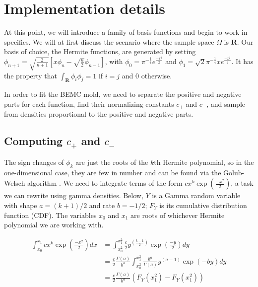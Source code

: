 \documentclass{article}
\begin{document}
\section{Implementation details}
At this point, we will introduce a family of basis functions and begin to work in specifics. We will at first discuss the scenario where the sample space $\Omega$ is $\mathbf{R}$. %
Our basis of choice, the Hermite functions, are generated by setting $\phi_{n+1}=\sqrt{\frac{2}{n+1}}\left[x\phi_n-\sqrt{\frac{n}{2}}\phi_{n-1}\right]$, with $\phi_0=\pi^{-\frac{1}{4}}e^{\frac{-x^2}{2}}$ and $\phi_1=\sqrt{2} \pi^{-\frac{1}{4}}xe^{\frac{-x^2}{2}}$. It has the property that $\int_{\mathbf{R}}\phi_i\phi_j=1$ if $i = j$ and $0$ otherwise. 

In order to fit the BEMC mold, we need to separate the positive and negative parts for each function, find their normalizing constants $c_+$ and $c_-$, and sample from densities proportional to the positive and negative parts. 

\subsection{Computing $c_+$ and $c_-$}
The sign changes of $\phi_k$ are just the roots of the $k$th Hermite polynomial, so in the one-dimensional case, they are few in number and can be found via the Golub-Welsch algorithm \cite{} . We need to integrate terms of the form $cx^k\exp(\frac{-x^2}{2})$, a task we can rewrite using gamma densities. Below, $Y$ is a Gamma random variable with shape $a = (k+1)/2$ and rate $b=-1/2$; $F_Y$ is its cumulative distribution function (CDF). The variables $x_0$ and $x_1$ are roots of whichever Hermite polynomial we are working with.

\begin{align*}
\int_{x_0}^{x_1} cx^k\exp(\frac{-x^2}{2})dx 
& =  \int_{x_0^2}^{x_1^2} \frac{c}{2}y^{(\frac{k-1}{2})}\exp(\frac{-y}{2})dy \\
& =  \frac{c}{2} \frac{\Gamma(a)}{b^a} \int_{x_0^2}^{x_1^2} \frac{b^a}{\Gamma(a)}y^{(a-1)}\exp(-by)dy \\
& =  \frac{c}{2} \frac{\Gamma(a)}{b^a} (F_Y(x_1^2)-F_Y(x_1^2))\\
\end{align*}
\end{document}
